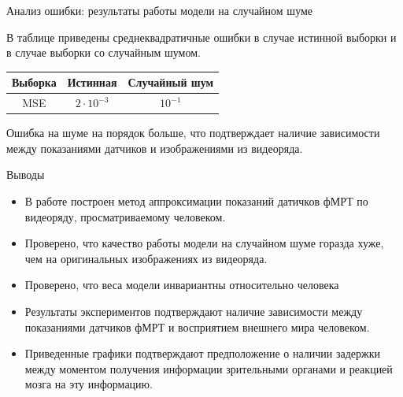 \documentclass[9pt,pdf]{beamer} %
\begin{document}
\begin{frame}{Анализ ошибки: результаты работы модели на случайном шуме}
\begin{block}{}
В таблице приведены среднеквадратичные ошибки в случае истинной выборки и в случае выборки со случайным шумом.

\begin{table}[h!]
    \centering
    \begin{tabular}{|c|c|c|}
        \hline
        Выборка	&	Истинная	&	Случайный шум \\ \hline \hline
        MSE		& 	$2 \cdot 10^{-3}$	 &		$10^{-1}$ \\ \hline
    \end{tabular}
    \label{table_3}
\end{table}

Ошибка на шуме на порядок больше, что подтверждает наличие зависимости между показаниями датчиков и изображениями из видеоряда.
\end{block}
\end{frame}
\begin{frame}{Выводы}
\begin{itemize}
    \item В работе построен метод аппроксимации показаний датичков фМРТ по видеоряду, просматриваемому человеком. 
    \item Проверено, что качество работы модели на случайном шуме горазда хуже, чем на оригинальных изображениях из видеоряда.
    \item Проверено, что веса модели инвариантны относительно человека
    \item Результаты экспериментов подтверждают наличие зависимости между показаниями датчиков фМРТ и восприятием внешнего мира человеком.
    \item Приведенные графики подтверждают предположение о наличии задержки между моментом получения информации зрительными органами и реакцией мозга на эту информацию.
\end{itemize}
\end{frame}
\end{document}
